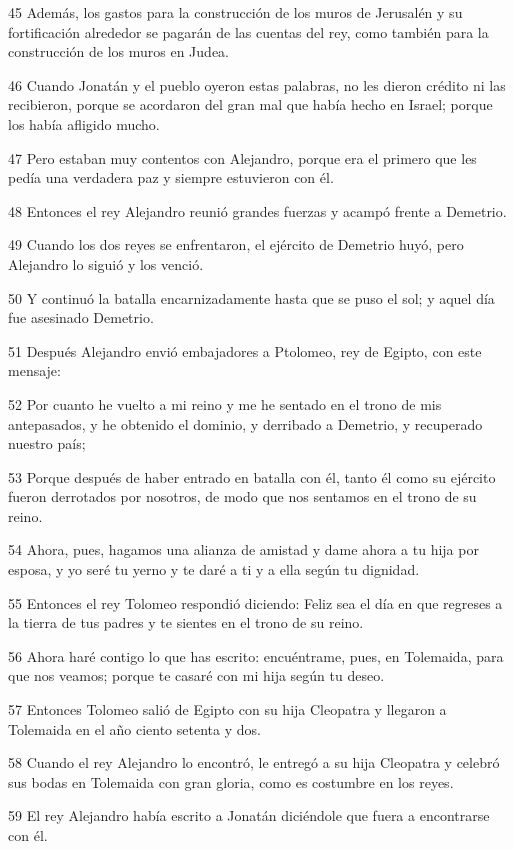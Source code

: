 \par 45 Además, los gastos para la construcción de los muros de Jerusalén y su fortificación alrededor se pagarán de las cuentas del rey, como también para la construcción de los muros en Judea.
\par 46 Cuando Jonatán y el pueblo oyeron estas palabras, no les dieron crédito ni las recibieron, porque se acordaron del gran mal que había hecho en Israel; porque los había afligido mucho.
\par 47 Pero estaban muy contentos con Alejandro, porque era el primero que les pedía una verdadera paz y siempre estuvieron con él.
\par 48 Entonces el rey Alejandro reunió grandes fuerzas y acampó frente a Demetrio.
\par 49 Cuando los dos reyes se enfrentaron, el ejército de Demetrio huyó, pero Alejandro lo siguió y los venció.
\par 50 Y continuó la batalla encarnizadamente hasta que se puso el sol; y aquel día fue asesinado Demetrio.
\par 51 Después Alejandro envió embajadores a Ptolomeo, rey de Egipto, con este mensaje:
\par 52 Por cuanto he vuelto a mi reino y me he sentado en el trono de mis antepasados, y he obtenido el dominio, y derribado a Demetrio, y recuperado nuestro país;
\par 53 Porque después de haber entrado en batalla con él, tanto él como su ejército fueron derrotados por nosotros, de modo que nos sentamos en el trono de su reino.
\par 54 Ahora, pues, hagamos una alianza de amistad y dame ahora a tu hija por esposa, y yo seré tu yerno y te daré a ti y a ella según tu dignidad.
\par 55 Entonces el rey Tolomeo respondió diciendo: Feliz sea el día en que regreses a la tierra de tus padres y te sientes en el trono de su reino.
\par 56 Ahora haré contigo lo que has escrito: encuéntrame, pues, en Tolemaida, para que nos veamos; porque te casaré con mi hija según tu deseo.
\par 57 Entonces Tolomeo salió de Egipto con su hija Cleopatra y llegaron a Tolemaida en el año ciento setenta y dos.
\par 58 Cuando el rey Alejandro lo encontró, le entregó a su hija Cleopatra y celebró sus bodas en Tolemaida con gran gloria, como es costumbre en los reyes.
\par 59 El rey Alejandro había escrito a Jonatán diciéndole que fuera a encontrarse con él.
